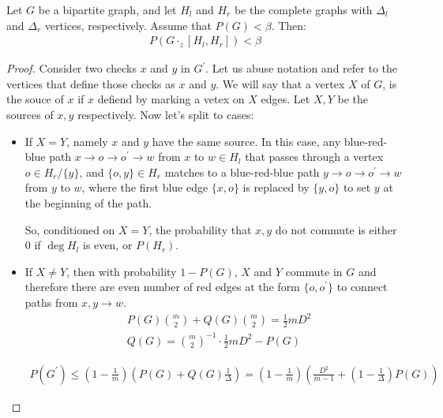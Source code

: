 \documentclass[manuscript,screen,review]{acmart}
\begin{document}
\begin{claim}  
Let $G$ be a bipartite graph, and let $H_{l}$ and $H_{r}$ be the complete graphs with $\Delta_{l}$ and $\Delta_{r}$ vertices, respectively. Assume that $P(G) < \beta$. Then:
\begin{equation*}
  \begin{split}
      P(G \cdot_{z} [H_{l},H_{r}]) < \beta
  \end{split}
\end{equation*}
\end{claim}
\begin{proof}
  Consider two checks $x$ and $y$ in $G^{\prime}$. Let us abuse notation and refer to the vertices that define those checks as $x$ and $y$. We will say that a vertex $X$ of $G$, is the souce of $x$ if $x$ defiend by marking a vetex on $X$ edges. Let $X,Y$ be the sources of $x,y$ respectively. Now let's split to cases:
  \begin{itemize}
    \item If $X = Y$, namely $x$ and $y$ have the same source. In this case, any blue-red-blue path $x \rightarrow o \rightarrow o^{\prime} \rightarrow w$ from $x$ to $w \in H_{l}$ that passes through a vertex $o \in H_{r}/\{y\}$, and $\{o,y\} \in H_{r}$ matches to a blue-red-blue path $y \rightarrow o \rightarrow o^{\prime} \rightarrow w$ from $y$ to $w$, where the first blue edge $\{ x, o \}$ is replaced by $\{ y, o \}$ to set $y$ at the beginning of the path.
   
    So, conditioned on $X=Y$, the probability that $x,y$ do not commute is either $0$ if $\deg H_{l}$ is even, or $P(H_{r})$.
  \item {} If $X\neq Y$, then with probability $1 - P(G)$, $X$ and $Y$ commute in $G$ and therefore there are even number of red edges at the form $\{o , o^{\prime}\}$ to connect paths from $x,y \rightarrow w$.     
    \begin{equation*}
      \begin{split}
        & P(G){ m \choose 2} + Q(G){ m \choose 2} = \frac{1}{2}m D^{2} \\ 
        & Q(G) = { m \choose 2 }^{-1}\cdot \frac{1}{2}mD^{2} - P(G)
      \end{split}
    \end{equation*}
    
    \begin{equation*}
      \begin{split}
        P(G^{\prime}) \le \left( 1 - \frac{1}{m} \right) \left( P(G) + Q(G)  \frac{1}{\Delta} \right) = \left( 1 - \frac{1}{m} \right) \left(  \frac{D^{2}}{m-1} + \left( 1 -  \frac{1}{\Delta}\right)P(G) \right)
      \end{split}
    \end{equation*}
  \end{itemize}
\end{proof}
\end{document}
